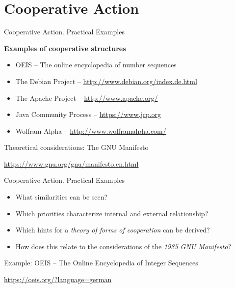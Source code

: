 \documentclass{beamer}
\title{Modelling Sustainable Systems\\ and Semantic Web\\[6pt] Cooperative
  Action in Digital Change \vskip1em}
\subtitle{Lecture in the Module 10-202-2309\\ for Master Computer Science}
\author{Prof. Dr. Hans-Gert Gräbe\\
\url{http://www.informatik.uni-leipzig.de/~graebe}}
\date{July 2021}
\begin{document}
{
\begin{frame}
  \titlepage
\end{frame}}

\section{Cooperative Action}
\begin{frame}{Cooperative Action. Practical Examples}

\textbf{Examples of cooperative structures}
\begin{itemize}
\item OEIS -- The online encyclopedia of number sequences
\item The Debian Project -- \url{http://www.debian.org/index.de.html} 
\item The Apache Project -- \url{http://www.apache.org/}
\item Java Community Process -- \url{https://www.jcp.org}
\item Wolfram Alpha -- \url{http://www.wolframalpha.com/}
\end{itemize}

Theoretical considerations: The GNU Manifesto

\url{https://www.gnu.org/gnu/manifesto.en.html}

\end{frame}

\begin{frame}{Cooperative Action. Practical Examples}
\begin{itemize}
\item What similarities can be seen?
\item Which priorities characterize internal and external relationship?
\item Which hints for a \emph{theory of forms of cooperation} can be derived?
\item How does this relate to the considerations of the \emph{1985 GNU
  Manifesto}?
\end{itemize}

Example: OEIS -- The Online Encyclopedia of Integer Sequences

\url{https://oeis.org/?language=german}
\end{frame}
\end{document}
